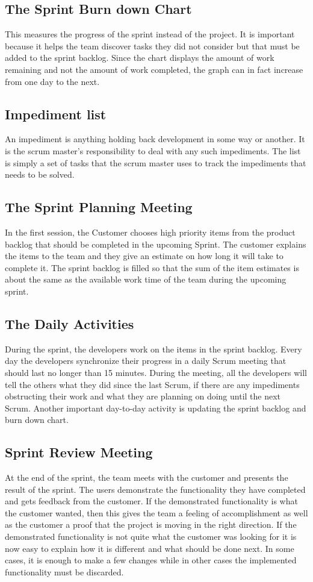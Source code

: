 \documentclass[a4paper, 12pt]{report}
\begin{document}
\subsection{The Sprint Burn down Chart} 
This measures the progress of the sprint instead of the project. It is important because it helps the
team discover tasks they did not consider but that must be added to the sprint backlog. Since the
chart displays the amount of work remaining and not the amount of work completed, the graph
can in fact increase from one day to the next.
\subsection{Impediment list} 
An impediment is anything holding back development in some way or another. It is the scrum
master’s responsibility to deal with any such impediments. The list is simply a set of tasks that
the scrum master uses to track the impediments that needs to be solved.
\subsection{The Sprint Planning Meeting} 
In the first session, the Customer chooses high priority items from the product backlog that
should be completed in the upcoming Sprint. The customer explains the items to the team and
they give an estimate on how long it will take to complete it. The sprint backlog is filled so that
the sum of the item estimates is about the same as the available work time of the team during the
upcoming sprint.
\subsection{The Daily Activities} 
During the sprint, the developers work on the items in the sprint backlog. Every day the
developers synchronize their progress in a daily Scrum meeting that should last no longer than
15 minutes. During the meeting, all the developers will tell the others what they did since the last
Scrum, if there are any impediments obstructing their work and what they are planning on doing
until the next Scrum. Another important day-to-day activity is updating the sprint backlog and
burn down chart.
\subsection{Sprint Review Meeting} 
At the end of the sprint, the team meets with the customer and presents the result of the sprint.
The users demonstrate the functionality they have completed and gets feedback from the
customer. If the demonstrated functionality is what the customer wanted, then this gives the team
a feeling of accomplishment as well as the customer a proof that the project is moving in the
right direction. If the demonstrated functionality is not quite what the customer was looking for it
is now easy to explain how it is different and what should be done next. In some cases, it is
enough to make a few changes while in other cases the implemented functionality must be
discarded.
\end{document}
